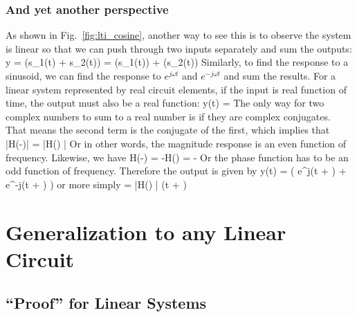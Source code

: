\subsubsection{And yet another perspective}

As shown in Fig.~\ref{fig:lti_cosine}, another way to see this is to observe the system is linear so that we can push through two inputs separately and sum the outputs:
\be
          y = (s_1(t) + s_2(t)) = (s_1(t)) + (s_2(t)) 
\ee
Similarly, to find the response to a sinusoid, we can find the response to $e^{j\omega t}$      and  $e^{-j\omega t}$  and sum the results.  For a linear system represented by real circuit elements, if  the input is real function of time, the output must also be a real function:
\be 
	y(t) = 
\ee
The only way for two complex numbers to sum to a real number is if they are complex conjugates.  That means the second term is the conjugate of the first, which implies that
\be
	|H(-\omega)| = |H(\omega) |
\ee 
Or in other words, the magnitude response is an even function of frequency.  Likewise, we have
\be
	\angle H(-\omega) = -\angle H(\omega) = - \phi 
\ee 
Or the phase function has to be an odd function of frequency.  Therefore the output is given by
\be
	 y(t) =  \left( e^{j(\omega t + \phi)} + e^{-j(\omega t + \phi)} \right) 
\ee
or more simply
\be = |H(\omega) | \cos(\omega t + \phi) \ee





\section{Generalization to any Linear Circuit}






\subsection{``Proof'' for Linear Systems}


